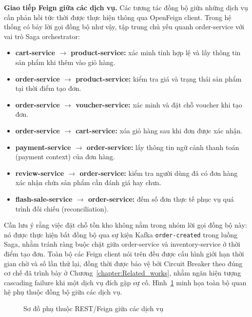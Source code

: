\documentclass[../DoAn.tex]{subfiles}
\begin{document}
{\textbf{Giao tiếp Feign giữa các dịch vụ.} Các tương tác đồng bộ giữa những dịch vụ cần phản
hồi tức thời được thực hiện thông qua OpenFeign client. Trong hệ thống có bảy lời gọi đồng bộ
như vậy, tập trung chủ yếu quanh order-service với vai trò Saga orchestrator:

\begin{itemize}[noitemsep]
    \item \textbf{cart-service $\rightarrow$ product-service:} xác minh tính hợp lệ và lấy
          thông tin sản phẩm khi thêm vào giỏ hàng.
    \item \textbf{order-service $\rightarrow$ product-service:} kiểm tra giá và trạng thái
          sản phẩm tại thời điểm tạo đơn.
    \item \textbf{order-service $\rightarrow$ voucher-service:} xác minh và đặt chỗ voucher
          khi tạo đơn.
    \item \textbf{order-service $\rightarrow$ cart-service:} xóa giỏ hàng sau khi đơn được
          xác nhận.
    \item \textbf{payment-service $\rightarrow$ order-service:} lấy thông tin ngữ cảnh thanh
          toán (payment context) của đơn hàng.
    \item \textbf{review-service $\rightarrow$ order-service:} kiểm tra người dùng đã có đơn
          hàng xác nhận chứa sản phẩm cần đánh giá hay chưa.
    \item \textbf{flash-sale-service $\rightarrow$ order-service:} đếm số đơn thực tế phục vụ
          quá trình đối chiếu (reconciliation).
\end{itemize}

Cần lưu ý rằng việc đặt chỗ tồn kho không nằm trong nhóm lời gọi đồng bộ này: nó được thực
hiện bất đồng bộ qua sự kiện Kafka \texttt{order-created} trong luồng Saga, nhằm tránh ràng
buộc chặt giữa order-service và inventory-service ở thời điểm tạo đơn. Toàn bộ các Feign client
nói trên đều được cấu hình giới hạn thời gian chờ và số lần thử lại, đồng thời được bảo vệ bởi
Circuit Breaker theo đúng cơ chế đã trình bày ở Chương~\ref{chapter:Related_works}, nhằm ngăn
hiện tượng cascading failure khi một dịch vụ đích gặp sự cố. Hình~\ref{fig:feign-dependencies}
minh họa toàn bộ quan hệ phụ thuộc đồng bộ giữa các dịch vụ.

\begin{figure}[!H]
    \centering
    \caption{Sơ đồ phụ thuộc REST/Feign giữa các dịch vụ}
    \label{fig:feign-dependencies}
\end{figure}

}
\end{document}
